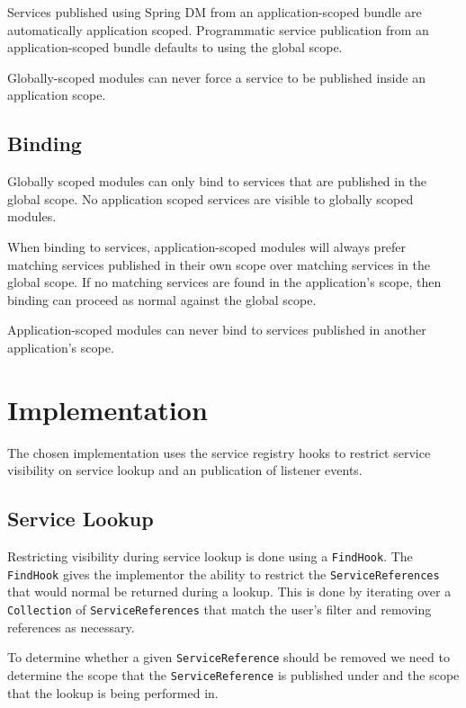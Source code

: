 \documentclass[a4paper]{article}
\begin{document}
Services published using Spring DM from an application-scoped bundle are automatically application scoped. Programmatic service publication from an application-scoped bundle defaults to using the global scope.

Globally-scoped modules can never force a service to be published inside an application scope.

\subsection{Binding}

Globally scoped modules can only bind to services that are published in the global scope. No application scoped services are visible to globally scoped modules.

When binding to services, application-scoped modules will always prefer matching services published in their own scope over matching services in the global scope. If no matching services are found in the application's scope, then binding can proceed as normal against the global scope.

Application-scoped modules can never bind to services published in another application's scope.

\clearpage
\section{Implementation}

The chosen implementation uses the service registry hooks to restrict service visibility on service lookup and an publication of listener events.

\subsection{Service Lookup}

Restricting visibility during service lookup is done using a \texttt{FindHook}. The \texttt{FindHook} gives the implementor the ability to restrict the \texttt{ServiceReferences} that would normal be returned during a lookup. This is done by iterating over a \texttt{Collection} of \texttt{ServiceReferences} that match the user's filter and removing references as necessary.

To determine whether a given \texttt{ServiceReference} should be removed we need to determine the scope that the \texttt{ServiceReference} is published under and the scope that the lookup is being performed in.
\end{document}
